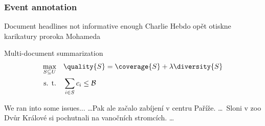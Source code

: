 \documentclass{beamer}
\newcommand{\budget}{\mathcal{B}}
\newcommand{\sentcost}{c}
\begin{document}
\begin{frame}
\frametitle{Event annotation}
\begin{block}{Document headlines not informative enough}
Charlie Hebdo op\v{e}t otiskne karikatury proroka Mohameda
\end{block}
Multi-document summarization \citep{multi-summarization-1, multi-summarization-2}
\begin{equation}
\begin{alignedat}{-1}
\max_{S \subseteq U} & \quad \quality{S} = \coverage{S} + \lambda \diversity{S} \\
\text{s. t.} & \quad \sum_{i \in S}{\sentcost_{i}} \leq \budget
\end{alignedat}
\end{equation}

\begin{block}{We ran into some issues...}
\dots Pak ale za\v{c}alo zab\'ijen\'i v centru Pa\v{r}\'i\v{z}e. \dots \ Sloni v zoo Dv\r{u}r Kr\'alov\'e si pochutnali na vano\v{c}n\'ich stromc\'ich. \dots
\end{block}

\end{frame}
\end{document}
